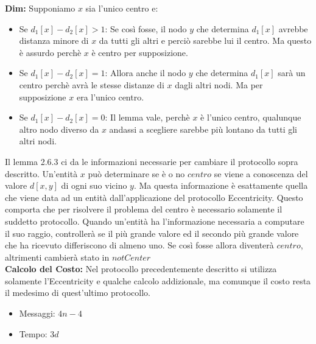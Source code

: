 \textbf{Dim:}
Supponiamo $x$ sia l'unico centro e:
\begin{itemize}
    \item Se $d_1[x]-d_2[x] > 1$: Se così fosse, il nodo $y$ che determina $d_1[x]$ avrebbe distanza minore di $x$ da tutti gli altri e perciò sarebbe lui il centro. Ma questo è assurdo perchè $x$ è centro per supposizione.
    \item Se $d_1[x]-d_2[x] = 1$: Allora anche il nodo $y$ che determina $d_1[x]$ sarà un centro perchè avrà le stesse distanze di $x$ dagli altri nodi. Ma per supposizione $x$ era l'unico centro.
    \item Se $d_1[x]-d_2[x] = 0$: Il lemma vale, perchè $x$ è l'unico centro, qualunque altro nodo diverso da $x$ andassi a scegliere sarebbe più lontano da tutti gli altri nodi.
\end{itemize}


Il lemma 2.6.3 ci da le informazioni necessarie per cambiare il protocollo sopra descritto. Un'entità $x$ può determinare se è o no $centro$ se viene a conoscenza del valore $d[x,y]$ di ogni suo vicino $y$. Ma questa informazione è esattamente quella che viene data ad un entità dall'applicazione del protocollo Eccentricity. Questo comporta che per risolvere il problema del centro è necessario solamente il suddetto protocollo. Quando un'entità ha l'informazione necessaria a computare il suo raggio, controllerà se il più grande valore ed il secondo più grande valore che ha ricevuto differiscono di almeno uno. Se così fosse allora diventerà $centro$, altrimenti cambierà stato in $notCenter$\\
\textbf{Calcolo del Costo:}
Nel protocollo precedentemente descritto si utilizza solamente l'Eccentricity e qualche calcolo addizionale, ma comunque il costo resta il medesimo di quest'ultimo protocollo.
\begin{itemize}
    \item Messaggi: $4n - 4$
    \item Tempo: $3d$
\end{itemize}

